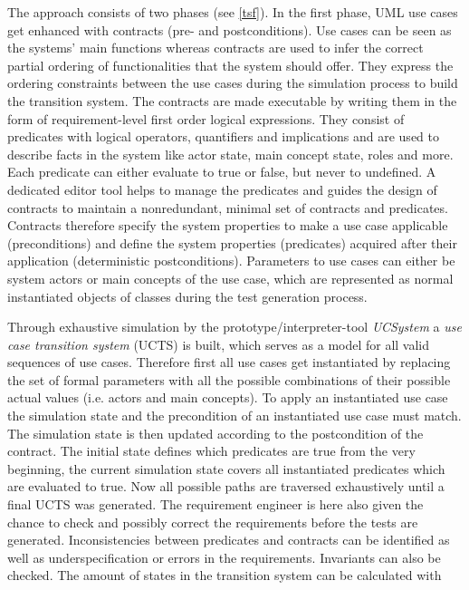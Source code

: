The approach consists of two phases (see \autoref{tsf}). In the first phase, UML use cases get enhanced with contracts (pre- and postconditions). Use cases can be seen as the systems' main functions whereas contracts are used to infer the correct partial ordering of functionalities that the system should offer. They express the ordering constraints between the use cases during the simulation process to build the transition system. The contracts are made executable by writing them in the form of requirement-level first order logical expressions. They consist of predicates with logical operators, quantifiers and implications and are used to describe facts in the system like actor state, main concept state, roles and more. Each predicate can either evaluate to true or false, but never to undefined. A dedicated editor tool helps to manage the predicates and guides the design of contracts to maintain a nonredundant, minimal set of contracts and predicates. Contracts therefore specify the system properties to make a use case applicable (preconditions) and define the system properties (predicates) acquired after their application (deterministic postconditions). Parameters to use cases can either be system actors or main concepts of the use case, which are represented as normal instantiated objects of classes during the test generation process. 

Through exhaustive simulation by the prototype/interpreter-tool \textit{UCSystem} a \textit{use case transition system} (UCTS) is built, which serves as a model for all valid sequences of use cases. Therefore first all use cases get instantiated by replacing the set of formal parameters with all the possible combinations of their possible actual values (i.e. actors and main concepts). To apply an instantiated use case the simulation state and the precondition of an instantiated use case must match. The simulation state is then updated according to the postcondition of the contract. The initial state defines which predicates are true from the very beginning, the current simulation state covers all instantiated predicates which are evaluated to true. Now all possible paths are traversed exhaustively until a final UCTS was generated. The requirement engineer is here also given the chance to check and possibly correct the requirements before the tests are generated. Inconsistencies between predicates and contracts can be identified as well as underspecification or errors in the requirements. Invariants can also be checked. The amount of states in the transition system can be calculated with


